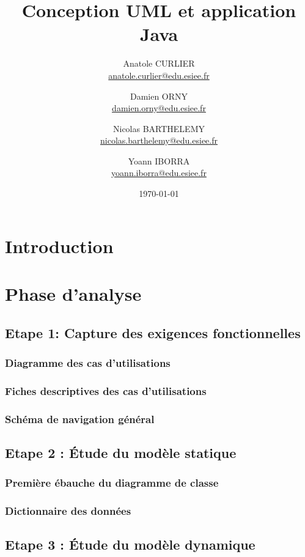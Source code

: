 \documentclass[a4paper,table]{article}
\title{Conception UML  et application Java}
\author{
	Anatole CURLIER \\ \href{mailto:anatole.curlier@edu.esiee.fr}{anatole.curlier@edu.esiee.fr} \and
	Damien ORNY \\ \href{mailto:damien.orny@edu.esiee.fr}{damien.orny@edu.esiee.fr} \and
	Nicolas BARTHELEMY \\ \href{mailto:nicolas.barthelemy@edu.esiee.fr}{nicolas.barthelemy@edu.esiee.fr} \and
	Yoann IBORRA \\ \href{mailto:yoann.iborra@edu.esiee.fr} {yoann.iborra@edu.esiee.fr}
}
\date{\today}
\begin{document}
\maketitle
\newpage
\tableofcontents
\newpage

\section*{Introduction}

\newpage

\section{Phase d'analyse}

\subsection{Etape 1: Capture des exigences fonctionnelles}

\subsubsection{Diagramme des cas d'utilisations}

\subsubsection{Fiches descriptives des cas d'utilisations}

\subsubsection{Schéma de navigation général}

\subsection{Etape 2 : Étude du modèle statique}

\subsubsection{Première ébauche du diagramme de classe}

\subsubsection{Dictionnaire des données}

\subsection{Etape 3 : Étude du modèle dynamique}
\end{document}
